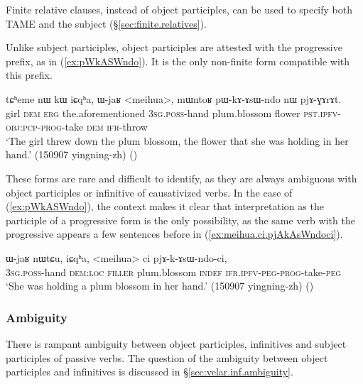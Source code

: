 Finite relative clauses, instead of object participles, can be used to specify both TAME and the subject (§\ref{sec:finite.relatives}).

Unlike subject participles, object participles are attested with the progressive  prefix, as in (\ref{ex:pWkASWndo}). It is the only non-finite form compatible with this prefix.  

\begin{exe}
\ex  \label{ex:pWkASWndo}
\gll  tɕʰeme nɯ kɯ iɕqʰa, ɯ-jaʁ <meihua>, mɯntoʁ pɯ-kɤ-ɤsɯ-ndo nɯ pjɤ-ɣɤrɤt.  \\
girl \textsc{dem} \textsc{erg} the.aforementioned \textsc{3sg}.\textsc{poss}-hand plum.blossom flower \textsc{pst}.\textsc{ipfv}-\textsc{obj}:\textsc{pcp}-\textsc{prog}-take \textsc{dem} \textsc{ifr}-throw \\
\glt `The girl threw down the plum blossom, the flower that she was holding in her hand.' (150907 yingning-zh)
()
\end{exe}

These forms are rare and difficult to identify, as they are always ambiguous with object participles or infinitive of causativized verbs. In the case of (\ref{ex:pWkASWndo}), the context makes it clear that interpretation as the participle of a progressive form is the only possibility, as the same verb with the progressive appears a few sentences before in (\ref{ex:meihua.ci.pjAkAsWndoci}).

\begin{exe}
\ex  \label{ex:meihua.ci.pjAkAsWndoci}
\gll   ɯ-jaʁ nɯtɕu, iɕqʰa, <meihua> ci pjɤ-k-ɤsɯ-ndo-ci, \\
\textsc{3sg}.\textsc{poss}-hand \textsc{dem}:\textsc{loc} \textsc{filler} plum.blossom \textsc{indef} \textsc{ifr}.\textsc{ipfv}-\textsc{peg}-\textsc{prog}-take-\textsc{peg} \\
 \glt `She was holding a plum blossom in her hand.' (150907 yingning-zh) ()
\end{exe}

\subsubsection{Ambiguity} \label{sec:object.participle.ambiguity}
There is rampant ambiguity between object participles,  infinitives and subject participles of passive verbs.  The question of the ambiguity between object participles and  infinitives is discussed in §\ref{sec:velar.inf.ambiguity}.

